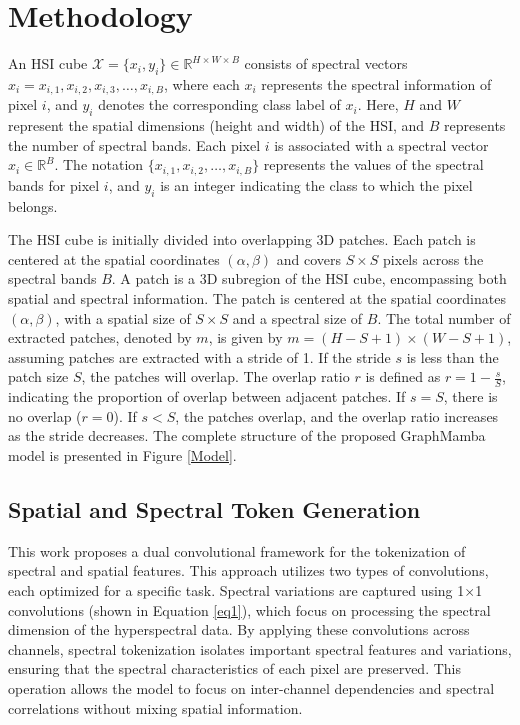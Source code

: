 \documentclass[journal]{IEEEtran}
\begin{document}
\section{Methodology}
\label{Meth}

An HSI cube $\mathcal{X} = \{x_i, y_i\} \in \mathbb{R}^{H \times W \times B}$ consists of spectral vectors $x_i = {x_{i,1}, x_{i,2}, x_{i,3}, \dots, x_{i,B}}$, where each $x_i$ represents the spectral information of pixel $i$, and $y_i$ denotes the corresponding class label of $x_i$. Here, $H$ and $W$ represent the spatial dimensions (height and width) of the HSI, and $B$ represents the number of spectral bands. Each pixel $i$ is associated with a spectral vector $x_i \in \mathbb{R}^{B}$. The notation $\{{x_{i,1}, x_{i,2}, \dots, x_{i,B}}\}$ represents the values of the spectral bands for pixel $i$, and $y_i$ is an integer indicating the class to which the pixel belongs.

The HSI cube is initially divided into overlapping 3D patches. Each patch is centered at the spatial coordinates $(\alpha, \beta)$ and covers $S \times S$ pixels across the spectral bands $B$. A patch is a 3D subregion of the HSI cube, encompassing both spatial and spectral information. The patch is centered at the spatial coordinates $(\alpha, \beta)$, with a spatial size of $S \times S$ and a spectral size of $B$. The total number of extracted patches, denoted by $m$, is given by $m = (H - S + 1) \times (W - S + 1)$, assuming patches are extracted with a stride of 1. If the stride $s$ is less than the patch size $S$, the patches will overlap. The overlap ratio $r$ is defined as $r = 1 - \frac{s}{S}$, indicating the proportion of overlap between adjacent patches. If $s = S$, there is no overlap ($r = 0$). If $s < S$, the patches overlap, and the overlap ratio increases as the stride decreases. The complete structure of the proposed GraphMamba model is presented in Figure \ref{Model}.

\subsection{Spatial and Spectral Token Generation}

This work proposes a dual convolutional framework for the tokenization of spectral and spatial features. This approach utilizes two types of convolutions, each optimized for a specific task. Spectral variations are captured using 1$\times$1 convolutions (shown in Equation \ref{eq1}), which focus on processing the spectral dimension of the hyperspectral data. By applying these convolutions across channels, spectral tokenization isolates important spectral features and variations, ensuring that the spectral characteristics of each pixel are preserved. This operation allows the model to focus on inter-channel dependencies and spectral correlations without mixing spatial information.
\end{document}
